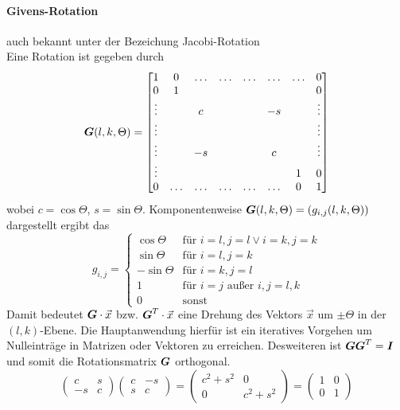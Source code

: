\paragraph{Givens-Rotation}
auch bekannt unter der Bezeichung Jacobi-Rotation \\
Eine Rotation ist gegeben durch
\begin{equation}
	\boldsymbol {G}(l, k, \Theta) = 
	\begin{bmatrix}
		1 & 0 & \hdots & \hdots & \hdots & \hdots & \hdots & 0 \\
		0 & 1 & & & & & & 0 \\
		\vdots & & c & & & -s & & \vdots \\
		\vdots & & & & & & & \vdots \\
		\vdots & & -s & & & c & & \vdots \\ 
		\vdots & & & & & & 1 & 0 \\ 
		0 & \hdots & \hdots & \hdots & \hdots & \hdots & 0 & 1 
	\end{bmatrix}
\end{equation}
wobei $c = \cos \Theta$, $s = \sin \Theta$. Komponentenweise $\boldsymbol {G}(l, k, \Theta) =  (g_{i,j}(l, k, \Theta))$ dargestellt ergibt das
\begin{equation}
	g_{i,j} = 
	\begin{cases} 
		\cos \Theta & \text{für } i = l, j = l \vee i = k, j = k \\
		\sin \Theta & \text{für } i = l, j = k \\
		- \sin \Theta & \text{für } i = k, j = l \\
		1 & \text{für } i = j \text{ außer } i, j = l, k \\
		0 & \text{sonst}
	\end{cases}
\end{equation}
Damit bedeutet $\boldsymbol {G} \cdot \vec x$ bzw. $\boldsymbol {G}^T \cdot \vec x$ eine Drehung des Vektors $\vec x$ um $\pm \Theta$ in der $(l, k)$-Ebene. Die Hauptanwendung hierfür ist ein iteratives Vorgehen um Nulleinträge in Matrizen oder Vektoren zu erreichen. Desweiteren ist $\boldsymbol {G} \boldsymbol {G}^T = \boldsymbol {I}$ und somit die Rotationsmatrix $\boldsymbol {G}$ orthogonal.
\begin{equation}
	\begin{pmatrix}
		c & s \\
		-s & c
	\end{pmatrix} 
	\begin{pmatrix}
		c & -s \\
		s & c
	\end{pmatrix} = 
	\begin{pmatrix}
		c^2 + s^2 & 0 \\
		0 & c^2 + s^2
	\end{pmatrix} =
	\begin{pmatrix}
		1 & 0 \\
		0 & 1
	\end{pmatrix} 
\end{equation}
